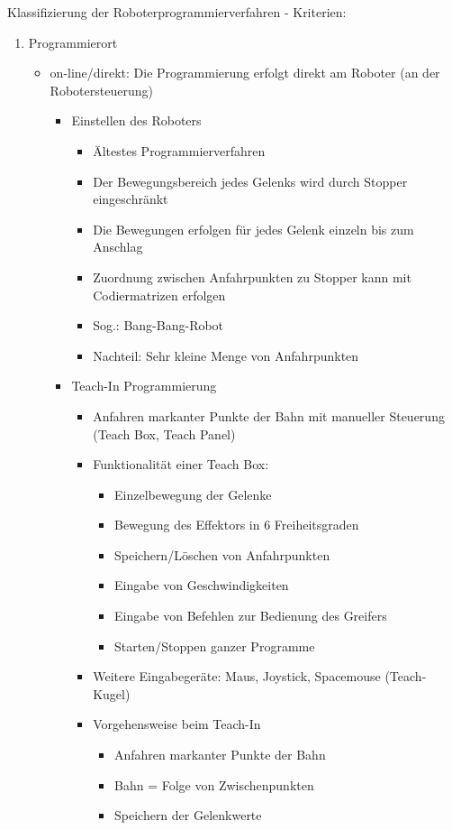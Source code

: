 \documentclass[paper=a4, fontsize=11pt]{scrartcl} %
\numberwithin{equation}{section} %
\numberwithin{figure}{section} %
\numberwithin{table}{section} %
\begin{document}
Klassifizierung der Roboterprogrammierverfahren - Kriterien:
\begin{enumerate}
\item Programmierort
\begin{itemize}
\item on-line/direkt: Die Programmierung erfolgt direkt am Roboter (an der Robotersteuerung)
\begin{itemize}
\item Einstellen des Roboters
\begin{itemize}
\item Ältestes Programmierverfahren
\item Der Bewegungsbereich jedes Gelenks wird durch Stopper eingeschränkt
\item Die Bewegungen erfolgen für jedes Gelenk einzeln bis zum Anschlag
\item Zuordnung zwischen Anfahrpunkten zu Stopper kann mit Codiermatrizen erfolgen
\item Sog.: Bang-Bang-Robot
\item Nachteil: Sehr kleine Menge von Anfahrpunkten
\end{itemize}
\item Teach-In Programmierung
\begin{itemize}
\item Anfahren markanter Punkte der Bahn mit manueller Steuerung (Teach Box, Teach Panel)
\item Funktionalität einer Teach Box:
\begin{itemize}
\item Einzelbewegung der Gelenke
\item Bewegung des Effektors in 6 Freiheitsgraden
\item Speichern/Löschen von Anfahrpunkten
\item Eingabe von Geschwindigkeiten
\item Eingabe von Befehlen zur Bedienung des Greifers
\item Starten/Stoppen ganzer Programme
\end{itemize}
\item Weitere Eingabegeräte: Maus, Joystick, Spacemouse (Teach-Kugel)
\item Vorgehensweise beim Teach-In
\begin{itemize}
\item Anfahren markanter Punkte der Bahn
\item Bahn = Folge von Zwischenpunkten
\item Speichern der Gelenkwerte

\end{itemize}
\end{itemize}
\end{itemize}
\end{itemize}
\end{enumerate}
\end{document}
